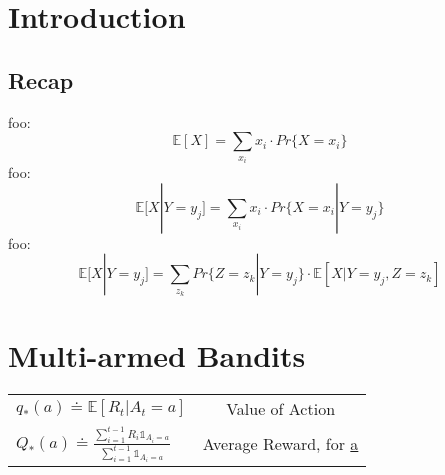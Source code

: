 \documentclass[10pt, landscape, a4paper]{article}
\begin{document}
    \begin{multicols}{3}
        \section{Introduction}

        \subsection{Recap}
        foo:
        \begin{equation}
            \mathbb{E}[X] = \sum_{x_i} x_i \cdot Pr\{ X = x_i \}
        \end{equation}
        foo:
        \begin{equation}
            \mathbb{E}[X | Y = y_j] = \sum_{x_i} x_i \cdot Pr\{ X = x_i | Y = y_j\}
        \end{equation}
        foo:
        \begin{equation}
            \mathbb{E}[X | Y = y_j] = \sum_{z_k} Pr\{Z=z_k | Y = y_j\} \cdot \mathbb{E}[X|Y = y_j, Z = z_k]
        \end{equation}


        \section{Multi-armed Bandits}
        \begin{tabularx}{\columnwidth}{ X c }
            $q_{*}(a) \doteq \mathbb{E}\left[R_t|A_t=a\right]$                                                    & Value of Action                   \\
            $Q_{*}(a) \doteq \frac{\sum_{i=1}^{t-1} R_i \mathds{1}_{A_i=a}}{\sum_{i=1}^{t-1} \mathds{1}_{A_i=a}}$ & Average Reward, for \underline{a}\\
        \end{tabularx}
%


\end{multicols}
\end{document}
